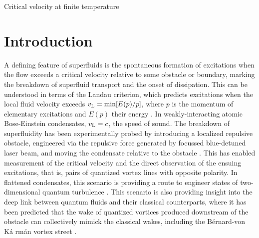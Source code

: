 \begin{chapter}{\label{cha:nonequib}Critical velocity at finite temperature}
  \section{Introduction}
A defining feature of superfluids is the spontaneous formation of excitations when the flow exceeds a critical velocity relative to some obstacle or boundary, marking the breakdown of superfluid transport and the onset of dissipation.  This can be understood in terms of the Landau criterion, which predicts excitations when the local fluid velocity exceeds $v_{\rm L} = \textrm{min} [E(p)/p]$, where $p$ is the momentum of elementary excitations and $E(p)$ their energy \cite{NozieresPines}.  In weakly-interacting atomic Bose-Einstein condensates,  $v_{\rm L}=c$, the speed of sound.  The breakdown of superfluidity has been experimentally probed by introducing a localized repulsive obstacle, engineered via the repulsive force generated by focussed blue-detuned laser beam, and moving the condensate relative to the obstacle \cite{Neely,kwon_moon_14,kwon_2015a,kwon_2015b,Raman,Onofrio,Inouye,desbuquois_2012}.  This has enabled measurement of the critical velocity and the direct observation of the ensuing excitations, that is, pairs of quantized vortex lines with opposite polarity.  In flattened condensates, this scenario is providing a route to engineer states of two-dimensional quantum turbulence \cite{Neely,kwon_moon_14}.  This scenario is also providing insight into the deep link between quantum fluids and their classical counterparts, where it has been predicted that the wake of quantized vortices produced downstream of the obstacle can collectively mimick the classical wakes, including the B{\' e}rnard-von K{\'a} rm{\' a}n vortex street \cite{saito10,stagg_parker_14}.  




\end{chapter}
